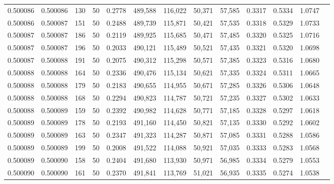 \begin{tabular}{rrrrrrrrrrrrr}
0.500086 & 0.500086 &   130 &  50 &                                     0.2778 & 489,588 & 116,022 &  50,371 &  57,585 & 0.3317 & 0.5334 & 1.0747 \\
0.500086 & 0.500087 &   151 &  50 &                                     0.2488 & 489,739 & 115,871 &  50,421 &  57,535 & 0.3318 & 0.5329 & 1.0733 \\
0.500087 & 0.500087 &   186 &  50 &                                     0.2119 & 489,925 & 115,685 &  50,471 &  57,485 & 0.3320 & 0.5325 & 1.0716 \\
0.500087 & 0.500087 &   196 &  50 &                                     0.2033 & 490,121 & 115,489 &  50,521 &  57,435 & 0.3321 & 0.5320 & 1.0698 \\
0.500087 & 0.500088 &   191 &  50 &                                     0.2075 & 490,312 & 115,298 &  50,571 &  57,385 & 0.3323 & 0.5316 & 1.0680 \\
0.500088 & 0.500088 &   164 &  50 &                                     0.2336 & 490,476 & 115,134 &  50,621 &  57,335 & 0.3324 & 0.5311 & 1.0665 \\
0.500088 & 0.500088 &   179 &  50 &                                     0.2183 & 490,655 & 114,955 &  50,671 &  57,285 & 0.3326 & 0.5306 & 1.0648 \\
0.500088 & 0.500088 &   168 &  50 &                                     0.2294 & 490,823 & 114,787 &  50,721 &  57,235 & 0.3327 & 0.5302 & 1.0633 \\
0.500088 & 0.500089 &   159 &  50 &                                     0.2392 & 490,982 & 114,628 &  50,771 &  57,185 & 0.3328 & 0.5297 & 1.0618 \\
0.500089 & 0.500089 &   178 &  50 &                                     0.2193 & 491,160 & 114,450 &  50,821 &  57,135 & 0.3330 & 0.5292 & 1.0602 \\
0.500089 & 0.500089 &   163 &  50 &                                     0.2347 & 491,323 & 114,287 &  50,871 &  57,085 & 0.3331 & 0.5288 & 1.0586 \\
0.500089 & 0.500089 &   199 &  50 &                                     0.2008 & 491,522 & 114,088 &  50,921 &  57,035 & 0.3333 & 0.5283 & 1.0568 \\
0.500089 & 0.500090 &   158 &  50 &                                     0.2404 & 491,680 & 113,930 &  50,971 &  56,985 & 0.3334 & 0.5279 & 1.0553 \\
0.500090 & 0.500090 &   161 &  50 &                                     0.2370 & 491,841 & 113,769 &  51,021 &  56,935 & 0.3335 & 0.5274 & 1.0538 \\

\end{tabular}
